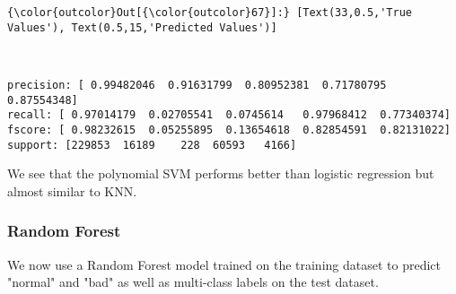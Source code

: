 \documentclass[11pt]{article}
\begin{document}
\begin{Verbatim}[commandchars=\\\{\}]
{\color{outcolor}Out[{\color{outcolor}67}]:} [Text(33,0.5,'True Values'), Text(0.5,15,'Predicted Values')]
\end{Verbatim}
            
    \begin{center}
    \end{center}
    { \hspace*{\fill} \\}
    
    \begin{Verbatim}[commandchars=\\\{\}]
precision: [ 0.99482046  0.91631799  0.80952381  0.71780795  0.87554348]
recall: [ 0.97014179  0.02705541  0.0745614   0.97968412  0.77340374]
fscore: [ 0.98232615  0.05255895  0.13654618  0.82854591  0.82131022]
support: [229853  16189    228  60593   4166]

    \end{Verbatim}

    We see that the polynomial SVM performs better than logistic regression
but almost similar to KNN.

    \subsubsection{Random Forest}\label{random-forest}

We now use a Random Forest model trained on the training dataset to
predict "normal" and "bad" as well as multi-class labels on the test
dataset.
\end{document}

